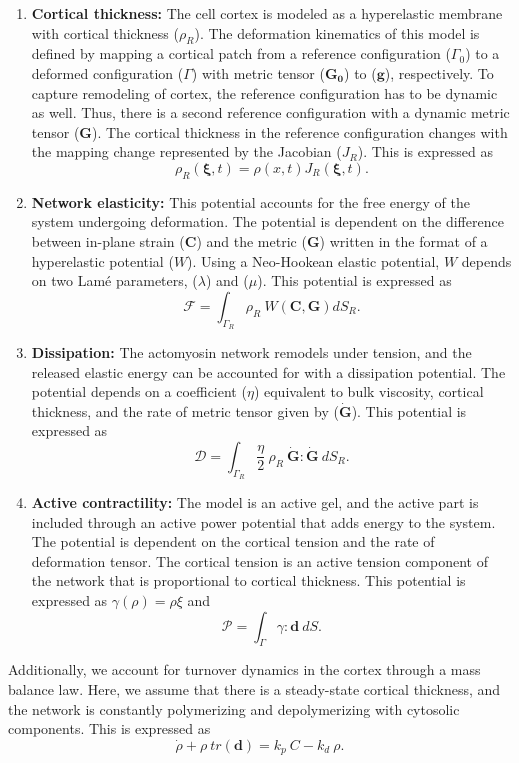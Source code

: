 \begin{enumerate}
	\item \textbf{Cortical thickness:} The cell cortex is modeled as a hyperelastic membrane with cortical thickness ($\rho_R$). The deformation kinematics of this model is defined by mapping a cortical patch from a reference configuration ($\Gamma_0$) to a deformed configuration ($\Gamma$) with metric tensor ($\mathbf{G_0}$) to ($\mathbf{g}$), respectively. To capture remodeling of cortex, the reference configuration has to be dynamic as well. Thus, there is a second reference configuration with a dynamic metric tensor ($\mathbf{G}$). The cortical thickness in the reference configuration changes with the mapping change represented by the Jacobian ($J_R$). This is expressed as 
	$$\rho_R(\mathbf{\xi}, t) = \rho(x,t)J_R(\mathbf{\xi},t).$$
	\item \textbf{Network elasticity:} This potential accounts for the free energy of the system undergoing deformation. The potential is dependent on the difference between in-plane strain ($\mathbf{C}$) and the metric ($\mathbf{G}$) written in the format of a hyperelastic potential ($W$). Using a Neo-Hookean elastic potential, $W$ depends on two Lamé parameters, ($\lambda$) and ($\mu$). This potential is expressed as $$\mathcal{F} = \int_{\Gamma_R} \rho_R \ W(\mathbf{C,G})dS_R.$$
	\item \textbf{Dissipation:} The actomyosin network remodels under tension, and the released elastic energy can be accounted for with a dissipation potential. The potential depends on a coefficient ($\eta$) equivalent to bulk viscosity, cortical thickness, and the rate of metric tensor given by ($\dot{\mathbf{G}}$). This potential is expressed as $$\mathcal{D} = \int_{\Gamma_R} \frac{\eta}{2}\ \rho_R \ \mathbf{\dot{G}}:\mathbf{\dot{G}} \ dS_R.$$
	\item \textbf{Active contractility:} The model is an active gel, and the active part is included through an active power potential that adds energy to the system. The potential is dependent on the cortical tension and the rate of deformation tensor. The cortical tension is an active tension component of the network that is proportional to cortical thickness. This potential is expressed as $\gamma(\rho) = \rho \xi$ and $$\mathcal{P} = \int_{\Gamma} \gamma : \mathbf{d} \ dS.$$
	
\end{enumerate}


Additionally, we account for turnover dynamics in the cortex through a mass balance law. Here, we assume that there is a steady-state cortical thickness, and the network is constantly polymerizing and depolymerizing with cytosolic components. This is expressed as $$\dot{\rho} + \rho \ tr(\mathbf{d}) = k_p\ C - k_d\ \rho.$$

